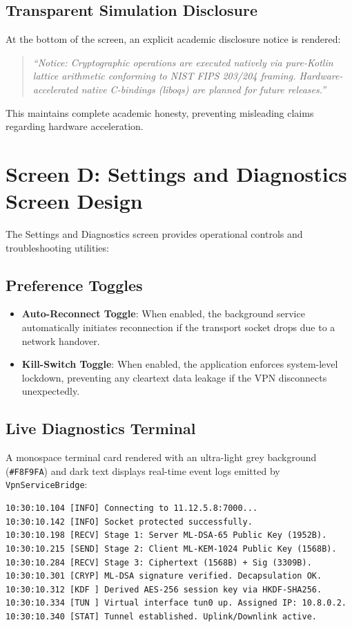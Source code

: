 \subsection{Transparent Simulation Disclosure}
At the bottom of the screen, an explicit academic disclosure notice is rendered:
\begin{quote}
\textit{``Notice: Cryptographic operations are executed natively via pure-Kotlin lattice arithmetic conforming to NIST FIPS 203/204 framing. Hardware-accelerated native C-bindings (liboqs) are planned for future releases.''}
\end{quote}
This maintains complete academic honesty, preventing misleading claims regarding hardware acceleration.

\section{Screen D: Settings and Diagnostics Screen Design}
\label{sec:screen_settings_diagnostics_design}

The Settings and Diagnostics screen provides operational controls and troubleshooting utilities:

\subsection{Preference Toggles}
\begin{itemize}
    \item \textbf{Auto-Reconnect Toggle}: When enabled, the background service automatically initiates reconnection if the transport socket drops due to a network handover.
    \item \textbf{Kill-Switch Toggle}: When enabled, the application enforces system-level lockdown, preventing any cleartext data leakage if the VPN disconnects unexpectedly.
\end{itemize}

\subsection{Live Diagnostics Terminal}
A monospace terminal card rendered with an ultra-light grey background (\texttt{\#F8F9FA}) and dark text displays real-time event logs emitted by \texttt{VpnServiceBridge}:
\begin{lstlisting}[basicstyle=\ttfamily\scriptsize]
10:30:10.104 [INFO] Connecting to 11.12.5.8:7000...
10:30:10.142 [INFO] Socket protected successfully.
10:30:10.198 [RECV] Stage 1: Server ML-DSA-65 Public Key (1952B).
10:30:10.215 [SEND] Stage 2: Client ML-KEM-1024 Public Key (1568B).
10:30:10.284 [RECV] Stage 3: Ciphertext (1568B) + Sig (3309B).
10:30:10.301 [CRYP] ML-DSA signature verified. Decapsulation OK.
10:30:10.312 [KDF ] Derived AES-256 session key via HKDF-SHA256.
10:30:10.334 [TUN ] Virtual interface tun0 up. Assigned IP: 10.8.0.2.
10:30:10.340 [STAT] Tunnel established. Uplink/Downlink active.
\end{lstlisting}

